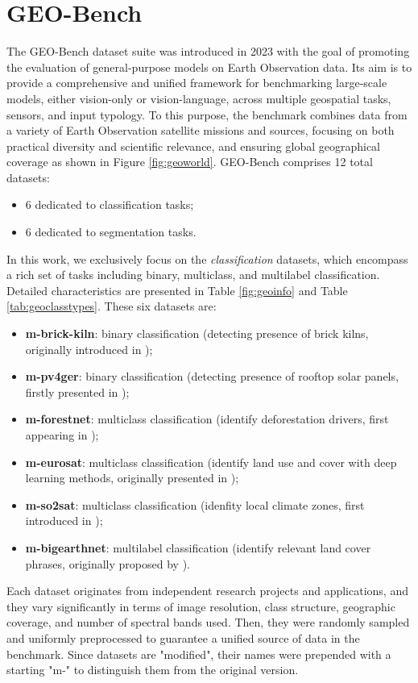 \documentclass[a4paper, oneside, english]{sapthesis} %
\begin{document}
\section{GEO-Bench}

The GEO-Bench dataset suite \cite{lacoste2023geo} was introduced in 2023 with the goal of promoting the evaluation of general-purpose models on Earth Observation data. Its aim is to provide a comprehensive and unified framework for benchmarking large-scale models, either vision-only or vision-language, across multiple geospatial tasks, sensors, and input typology. To this purpose, the benchmark combines data from a variety of Earth Observation satellite missions and sources, focusing on both practical diversity and scientific relevance, and ensuring global geographical coverage as shown in Figure \ref{fig:geoworld}. GEO-Bench comprises 12 total datasets:
\begin{itemize}
    \item 6 dedicated to classification tasks;
    \item 6 dedicated to segmentation tasks.
\end{itemize}
In this work, we exclusively focus on the \emph{classification} datasets, which encompass a rich set of tasks including binary, multiclass, and multilabel classification. Detailed characteristics are presented in Table \ref{fig:geoinfo} and Table \ref{tab:geoclasstypes}. These six datasets are:
\begin{itemize}
    \item \textbf{m-brick-kiln}: binary classification (detecting presence of brick kilns, originally introduced in \cite{lee2021scalable});
    \item \textbf{m-pv4ger}: binary classification (detecting presence of rooftop solar panels, firstly presented in \cite{mayer20223d});
    \item \textbf{m-forestnet}: multiclass classification (identify deforestation drivers, first appearing in \cite{irvin2020forestnet});
    \item \textbf{m-eurosat}: multiclass classification (identify land use and cover with deep learning methods, originally presented in \cite{helber2019eurosat});
    \item \textbf{m-so2sat}: multiclass classification (idenfity local climate zones, first introduced in  \cite{zhu2019so2sat});
    \item \textbf{m-bigearthnet}: multilabel classification (identify relevant land cover phrases, originally proposed by \cite{sumbul2021bigearthnet}).
\end{itemize}
Each dataset originates from independent research projects and applications, and they vary significantly in terms of image resolution, class structure, geographic coverage, and number of spectral bands used. Then, they were randomly sampled and uniformly preprocessed to guarantee a unified source of data in the benchmark. Since datasets are "modified", their names were prepended with a starting "m-" to distinguish them from the original version.
\end{document}
